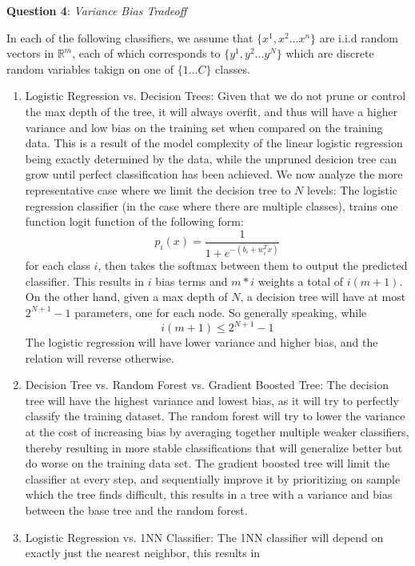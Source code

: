 \documentclass{article} %
\newcommand{\question}[2][]{
  \begin{flushleft}
    \textbf{Question #1}: \textit{#2}

\end{flushleft}}
\begin{document}
\question[4]{Variance Bias Tradeoff}
In each of the following classifiers, we assume that $\{x^1, x^2
\hdots x^n \}$ are i.i.d random vectors in $\mathbb{R}^m$, each
of which corresponds to $\{y^1, y^2...y^N\}$ which are discrete
random variables takign on one of $\{1...C\}$ classes.
\begin{enumerate}
  \item Logistic Regression vs. Decision Trees: Given that we do not
    prune or control the max depth of the tree, it will always
    overfit, and thus will have a higher variance and low bias on the
    training set when compared on the training data. This is a result
    of the model complexity of the linear logistic regression being
    exactly determined by the data, while the unpruned desicion tree
    can grow until perfect classification has been achieved. We now
    analyze the more representative case where we limit the decision
    tree to $N$ levels:
    The logistic regression classifier (in the case where there are
    multiple classes), trains one function logit function of the following form:
    \[
      p_i(x) = \frac{1}{1+e^{-(b_i + w_i^Tx)}}
    \]
    for each class $i$, then takes the softmax between them to output
    the predicted classifier. This results in $i$ bias terms and $m *
    i$ weights a total of $i(m+1)$. On the other hand, given a max
    depth of $N$, a decision tree will have at most $2^{N+1} - 1$
    parameters, one for each node. So generally speaking, while
    \[
      i(m+1) \le 2^{N+1} - 1
    \]
    The logistic regression will have lower variance and higher bias,
    and the relation will reverse otherwise.
  \item Decision Tree vs. Random Forest vs. Gradient Boosted Tree:
    The decision tree will have the highest variance and lowest bias,
    as it will try to perfectly classify the training dataset. The
    random forest will try to lower the variance at the cost of
    increasing bias by averaging together multiple weaker
    classifiers, thereby resulting in more stable classifications
    that will generalize better but do worse on the training data
    set. The gradient boosted tree will limit the classifier at every
    step, and sequentially improve it by prioritizing on sample which
    the tree finds difficult, this results in a tree with a variance
    and bias between the base tree and the random forest.
  \item Logistic Regression vs. 1NN Classifier: The 1NN classifier
    will depend on exactly just the nearest neighbor, this results in

\end{enumerate}
\end{document}
